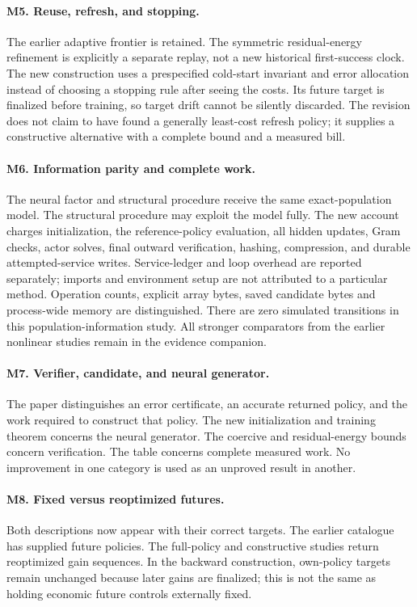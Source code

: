 \paragraph*{M5. Reuse, refresh, and stopping.}
The earlier adaptive frontier is retained. The symmetric residual-energy
refinement is explicitly a separate replay, not a new historical first-success
clock. The new construction uses a prespecified cold-start invariant and
error allocation instead of choosing a stopping rule after seeing the costs.
Its future target is finalized before training, so target drift cannot be
silently discarded. The revision does not claim to have found a generally
least-cost refresh policy; it supplies a constructive alternative with a
complete bound and a measured bill.

\paragraph*{M6. Information parity and complete work.}
The neural factor and structural procedure receive the same exact-population
model. The structural procedure may exploit the model fully. The new account
charges initialization, the reference-policy evaluation, all hidden updates,
Gram checks, actor solves, final outward verification, hashing, compression,
and durable attempted-service writes. Service-ledger and loop overhead are
reported separately; imports and environment setup are not attributed to a
particular method. Operation counts, explicit array bytes, saved candidate
bytes and process-wide memory are distinguished. There are zero simulated
transitions in this population-information study. All stronger comparators
from the earlier nonlinear studies remain in the evidence companion.

\paragraph*{M7. Verifier, candidate, and neural generator.}
The paper distinguishes an error certificate, an accurate returned policy,
and the work required to construct that policy. The new initialization and
training theorem concerns the neural generator. The coercive and
residual-energy bounds concern verification. The table concerns complete
measured work. No improvement in one category is used as an unproved result
in another.

\paragraph*{M8. Fixed versus reoptimized futures.}
Both descriptions now appear with their correct targets. The earlier catalogue
has supplied future policies. The full-policy and constructive studies return
reoptimized gain sequences. In the backward construction, own-policy targets
remain unchanged because later gains are finalized; this is not the same as
holding economic future controls externally fixed.

